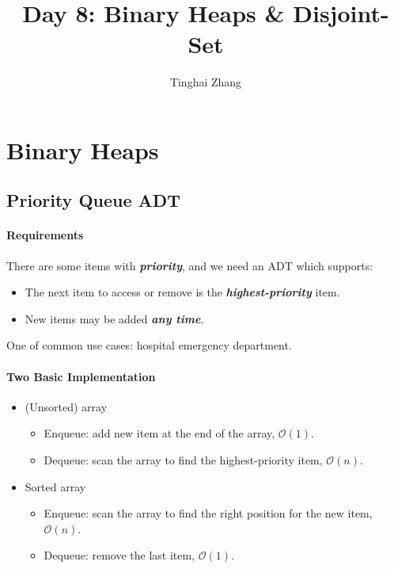 \documentclass[12pt,a4paper]{ctexart}
\title{Day 8: Binary Heaps \& Disjoint-Set}
\author{Tinghai Zhang}
\newcommand{\highlight}[1]{\textbf{\textit{#1}}}
\begin{document}
    \renewcommand{\baselinestretch}{1}
    \setlength{\abovedisplayskip}{5pt}
    \setlength{\belowdisplayskip}{5pt}
    \pagestyle{plain}

    \maketitle

    \tableofcontents

    \section{Binary Heaps}

    \subsection{Priority Queue ADT}

    \paragraph{Requirements}

    There are some items with \highlight{priority}, and we need an ADT which supports:

    \begin{itemize}
        \item The next item to access or remove is the \highlight{highest-priority} item.
        \item New items may be added \highlight{any time}.
    \end{itemize}

    One of common use cases: hospital emergency department.

    \paragraph{Two Basic Implementation}

    \begin{itemize}
        \item (Unsorted) array
        \begin{itemize}[left=1em]
            \item Enqueue: add new item at the end of the array, $\mathcal O(1)$.
            \item Dequeue: scan the array to find the highest-priority item, $\mathcal O(n)$.
        \end{itemize}
        \item Sorted array
        \begin{itemize}[left=1em]
            \item Enqueue: scan the array to find the right position for the new item, $\mathcal O(n)$.
            \item Dequeue: remove the last item, $\mathcal O(1)$.
        \end{itemize}
    \end{itemize}
\end{document}
